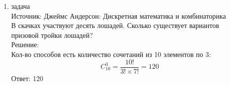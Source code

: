 \documentclass[a4paper,14pt]{extreport} %
\begin{document}
\begin{center}
\begin{enumerate}
						 \item {\large задача  }\\
						 Источник: Джеймс Андерсон: Дискретная математика и комбинаторика\\
						 \vspace{15pt}
						 В скачках участвуют десять лошадей. Сколько существует вариантов
						 призовой тройки лошадей?
						 \\
						 \vspace{15pt}
						 Решение:\\
						 Кол-во способов есть количество сочетаний из 10 элементов по 3:
						 \begin{equation}C_10^3 = \frac{10!}{3! \times 7! }= 120\end{equation}
						 Ответ: 120
						 
				\end{enumerate}
			\end{center}
			



	
	
\end{document}
